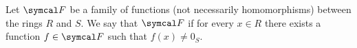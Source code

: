 \begin{definition}\label{def:functions_vanish_nowhere}
  Let \( \Cal{F} \) be a family of functions (not necessarily homomorphisms) between the rings \( R \) and \( S \). We say that \( \Cal{F} \)  if for every \( x \in R \) there exists a function \( f \in \Cal{F} \) such that \( f(x) \neq 0_S \).
\end{definition}

